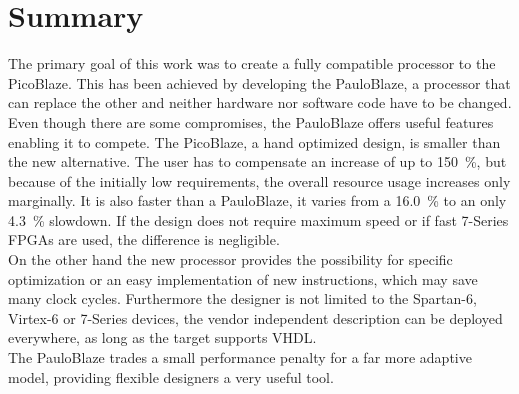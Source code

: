 \chapter{Summary}
\label{ch:sum}
The primary goal of this work was to create a fully compatible processor to the PicoBlaze.
This has been achieved by developing the PauloBlaze, a processor that can replace the other and neither hardware nor software code have to be changed.
Even though there are some compromises, the PauloBlaze offers useful features enabling it to compete.
The PicoBlaze, a hand optimized design, is smaller than the new alternative.
The user has to compensate an increase of up to \SI{150}{\percent}, but because of the initially low requirements, the overall resource usage increases only marginally.
It is also faster than a PauloBlaze, it varies from a \SI{16.0}{\percent} to an only \SI{4.3}{\percent} slowdown.
If the design does not require maximum speed or if fast 7-Series FPGAs are used, the difference is negligible.
\\
On the other hand the new processor provides the possibility for specific optimization or an easy implementation of new instructions, which may save many clock cycles.
Furthermore the designer is not limited to the Spartan-6, Virtex-6 or 7-Series devices, the vendor independent description can be deployed everywhere, as long as the target supports VHDL.
\\
The PauloBlaze trades a small performance penalty for a far more adaptive model, providing flexible designers a very useful tool.